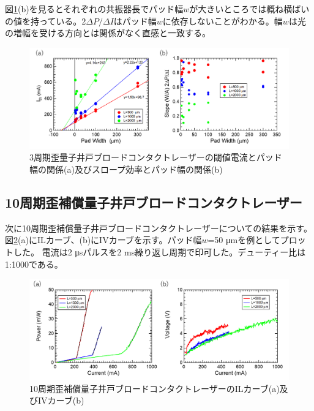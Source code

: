 図\ref{fig:fig_3_1_3QW_broadcontact_Ith}(b)を見るとそれぞれの共振器長でパッド幅$w$が大きいところでは概ね横ばいの値を持っている。2$\Delta P/\Delta I$はパッド幅$w$に依存しないことがわかる。幅$w$は光の増幅を受ける方向とは関係がなく直感と一致する。

\begin{figure}[h]

	\centering
	\includegraphics[width=15cm]{figure/fig_3_1_3QW_broadcontact_Ith.png}
	\centering
		\caption
		{3周期歪量子井戸ブロードコンタクトレーザーの閾値電流とパッド幅の関係(a)及びスロープ効率とパッド幅の関係(b)}
		\centering
		\label{fig:fig_3_1_3QW_broadcontact_Ith}
\end{figure}
\clearpage
\subsection{10周期歪補償量子井戸ブロードコンタクトレーザー}%
次に10周期歪補償量子井戸ブロードコンタクトレーザーについての結果を示す。図\ref{fig:fig_3_1_10QW_broadcontact_IL}(a)にILカーブ、(b)にIVカーブを示す。パッド幅$w$=50 \si{\micro\metre}を例としてプロットした。
電流は2 \si{\micro s}パルスを2 ms繰り返し周期で印可した。デューティー比は1:1000である。
\begin{figure}[h]
	\centering
	\includegraphics[width=15cm]{figure/fig_3_1_10QW_broadcontact_IL.png}
		\caption{10周期歪補償量子井戸ブロードコンタクトレーザーのILカーブ(a)及びIVカーブ(b)}
		\label{fig:fig_3_1_10QW_broadcontact_IL}
\end{figure}

